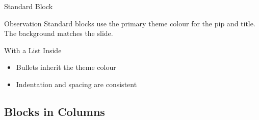 \documentclass[aspectratio=169]{beamer}
\begin{document}
\begin{frame}{Standard Block}
  \begin{block}{Observation}
    Standard blocks use the primary theme colour for the pip
    and title. The background matches the slide.
  \end{block}

  \begin{block}{With a List Inside}
    \begin{itemize}
      \item Bullets inherit the theme colour
      \item Indentation and spacing are consistent
    \end{itemize}
  \end{block}
\end{frame}



\subsection{Blocks in Columns}
\end{document}
